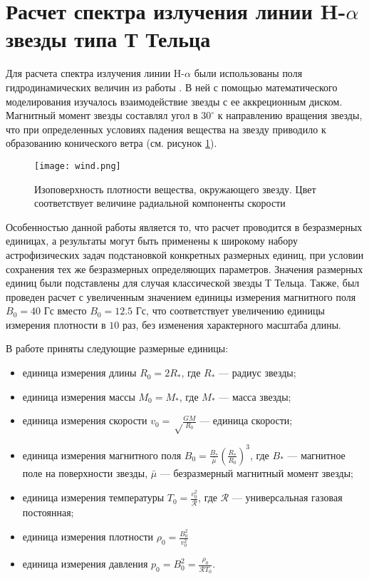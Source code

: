 \section{Расчет спектра излучения линии H-$\alpha$ звезды типа Т Тельца}

Для расчета спектра излучения линии H-$\alpha$ были использованы поля гидродинамических величин из работы \cite{romanova2009}. В ней с помощью математического моделирования изучалось взаимодействие звезды с ее аккреционным диском. Магнитный момент звезды составлял угол в $30^\circ$ к направлению вращения звезды, что при определенных условиях падения вещества на звезду приводило к образованию конического ветра (см. рисунок \ref{fig:wind}).
\begin{figure}[ht!]
\centering
\texttt{[image: wind.png]}
\caption{Изоповерхность плотности вещества, окружающего звезду. Цвет соответствует величине радиальной компоненты скорости}
\label{fig:wind}
\end{figure}

Особенностью данной работы является то, что расчет проводится в безразмерных единицах, а результаты могут быть применены к широкому набору астрофизических задач подстановкой конкретных размерных единиц, при условии сохранения тех же безразмерных определяющих параметров. Значения размерных единиц были подставлены для случая классической звезды Т Тельца. Также, был проведен расчет с увеличенным значением единицы измерения магнитного поля $B_0 = 40 \text{ Гс}$ вместо $B_0 = 12.5 \text{ Гс}$, что соответствует увеличению единицы измерения плотности в $10$ раз, без изменения характерного масштаба длины. 

В работе \cite{romanova2009} приняты следующие размерные единицы: 
\begin{itemize}
\item единица измерения длины $R_0 = 2 R_*$, где $R_*$ --- радиус звезды;
\item единица измерения массы $M_0 = M_*$, где $M_*$ --- масса звезды;
\item единица измерения скорости $v_0 = \sqrt\frac{GM}{R_0}$ --- единица скорости;
\item единица измерения магнитного поля $B_0 = \frac{B_*}{\bar \mu} \left(\frac{R_*}{R_0}\right)^3$, где $B_*$ --- магнитное поле на поверхности звезды, $\bar \mu$ --- безразмерный магнитный момент звезды;
\item единица измерения температуры $T_0 = \frac{v_0^2}{\mathcal R}$, где $\mathcal R$ --- универсальная газовая постоянная;
\item единица измерения плотности $\rho_0 = \frac{B_0^2}{v_0^2}$
\item единица измерения давления $p_0 = B_0^2 = \frac{\rho_0}{\mathcal{R} T_0}$.
\end{itemize}

